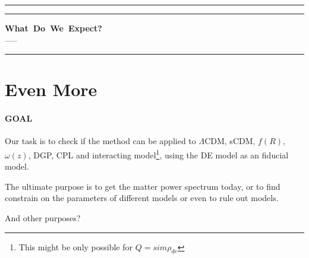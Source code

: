 







\hrule\vspace{1pt}\hrule
\begin{center}
\mbox{{\bf What Do We Expect?}} \\
\vspace{0.5em}
\mbox{{-----}}
\end{center}
\hrule




\section{Even More}

\paragraph{GOAL} Our task is to check if the method can be applied to $\Lambda$CDM, sCDM, $f(R)$, $\omega(z)$, DGP, CPL and interacting model\footnote{This might be only possible for $Q=sim\rho_{de}$}, using the DE model as an fiducial model.

The ultimate purpose is to get the matter power spectrum today, or to find constrain on the parameters of different models or even to rule out models.

And other purposes?



